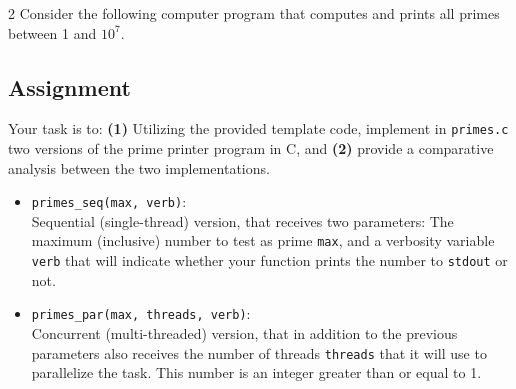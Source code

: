 \documentclass[12pt]{article}
\begin{document}
\begin{multicols}{2}  
  Consider the following computer program that computes and prints all primes between 1 and $10^{7}$.
\vspace{6pt}
  
    \begin{algorithm}[H] %
      \footnotesize
      \SetAlgoLined

      \caption{Prime printer}
      \vspace{-3pt}
    \end{algorithm}

\subsection*{Assignment}

Your task is to: \textbf{(1)} Utilizing the provided template code, implement in \texttt{primes.c} two versions of the prime printer program in C, and \textbf{(2)} provide a comparative analysis between the two implementations.

\begin{itemize}
  \item \texttt{primes\_seq(max, verb)}: \\
        Sequential (single-thread) version, that receives two parameters: The maximum (inclusive) number to test as prime \texttt{max}, and a verbosity variable \texttt{verb} that will indicate whether your function prints the number to \texttt{stdout} or not.

  \item \texttt{primes\_par(max, threads, verb)}: \\
        Concurrent (multi-threaded) version, that in addition to the previous parameters also receives the number of threads \texttt{threads} that it will use to parallelize the task. This number is an integer greater than or equal to 1. 
\end{itemize}


\end{multicols}
\end{document}
